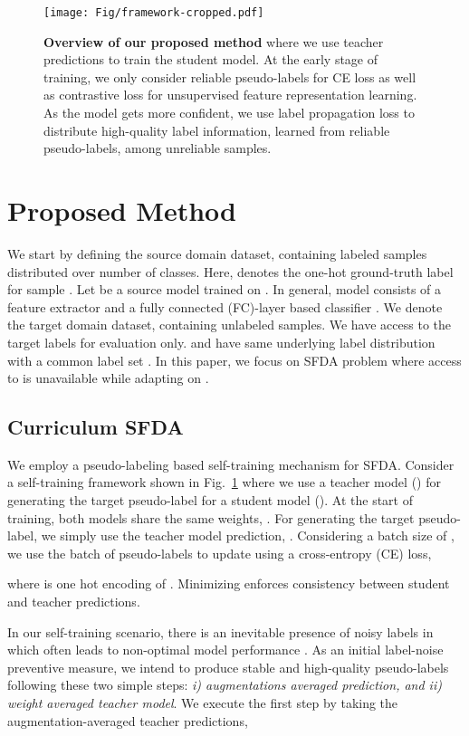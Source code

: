 \documentclass[10pt,twocolumn,letterpaper]{article}
\begin{document}
\begin{figure}[t]
    \centering
    \texttt{[image: Fig/framework-cropped.pdf]}
    \caption{\footnotesize \textbf{Overview of our proposed method} where we use teacher predictions to train the student model. At the early stage of training, we only consider reliable pseudo-labels for CE loss as well as contrastive loss for unsupervised feature representation learning. As the model gets more confident, we use label propagation loss to distribute high-quality label information, learned from reliable pseudo-labels, among unreliable samples. }
    \label{fig:framework}
    \vspace{-3mm}
\end{figure}
\section{Proposed Method}
We start by defining the source domain dataset,    containing  labeled samples distributed over  number of classes. Here,  denotes the one-hot ground-truth label for sample . Let  be a source model trained on . In general, model  consists of a feature extractor  and a fully connected (FC)-layer based classifier .  
We denote the target domain dataset,  containing  unlabeled samples. We have access to the target labels  for evaluation only.  and  have same underlying label distribution with a common label set  . In this paper, we focus on SFDA problem where access to  is unavailable while adapting  on . 
\vspace{-0.5mm}
\subsection{Curriculum SFDA}
We employ a pseudo-labeling based self-training mechanism for SFDA. Consider a self-training framework shown in Fig.~\ref{fig:framework} where we use a teacher model () for generating the target pseudo-label for a student model (). At the start of training, both models share the same weights, \ie . For generating the target pseudo-label, we simply use the teacher model prediction, . 
Considering a batch size of , we use the batch of pseudo-labels  to update   using a cross-entropy (CE) loss,

where  is one hot encoding of . Minimizing  enforces consistency between student and teacher predictions. 

In our self-training scenario, there is an inevitable presence of noisy labels in  which often leads to non-optimal model performance \cite{arpit2017closer}. As an initial label-noise preventive measure, we intend to produce stable and high-quality pseudo-labels following  these two simple steps: \emph{i) augmentations averaged prediction, and ii) weight averaged teacher model}. We execute the first step by taking the augmentation-averaged teacher predictions,  
\end{document}
